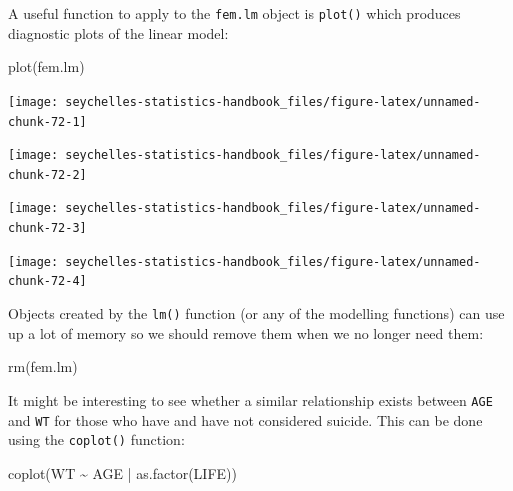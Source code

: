 \documentclass[
  12pt,
]{book}
\newenvironment{Shaded}{\begin{snugshade}}{\end{snugshade}}
\newcommand{\FunctionTok}[1]{\textcolor[rgb]{0.00,0.00,0.00}{#1}}
\newcommand{\NormalTok}[1]{#1}
\newcommand{\SpecialCharTok}[1]{\textcolor[rgb]{0.00,0.00,0.00}{#1}}
\begin{document}
\newpage

A useful function to apply to the \texttt{fem.lm} object is \texttt{plot()} which produces diagnostic plots of the linear model:

\begin{Shaded}
\begin{Highlighting}[]
\FunctionTok{plot}\NormalTok{(fem.lm)}
\end{Highlighting}
\end{Shaded}

\begin{center}\texttt{[image: seychelles-statistics-handbook\_files/figure-latex/unnamed-chunk-72-1]} \end{center}

\begin{center}\texttt{[image: seychelles-statistics-handbook\_files/figure-latex/unnamed-chunk-72-2]} \end{center}

\begin{center}\texttt{[image: seychelles-statistics-handbook\_files/figure-latex/unnamed-chunk-72-3]} \end{center}

\begin{center}\texttt{[image: seychelles-statistics-handbook\_files/figure-latex/unnamed-chunk-72-4]} \end{center}

\newpage

Objects created by the \texttt{lm()} function (or any of the modelling functions) can use up a lot of memory so we should remove them when we no longer need them:

\begin{Shaded}
\begin{Highlighting}[]
\FunctionTok{rm}\NormalTok{(fem.lm)}
\end{Highlighting}
\end{Shaded}

It might be interesting to see whether a similar relationship exists between \texttt{AGE} and \texttt{WT} for those who have and have not considered suicide. This can be done using the \texttt{coplot()} function:

\begin{Shaded}
\begin{Highlighting}[]
\FunctionTok{coplot}\NormalTok{(WT }\SpecialCharTok{\textasciitilde{}}\NormalTok{ AGE }\SpecialCharTok{|} \FunctionTok{as.factor}\NormalTok{(LIFE))}
\end{Highlighting}
\end{Shaded}
\end{document}
